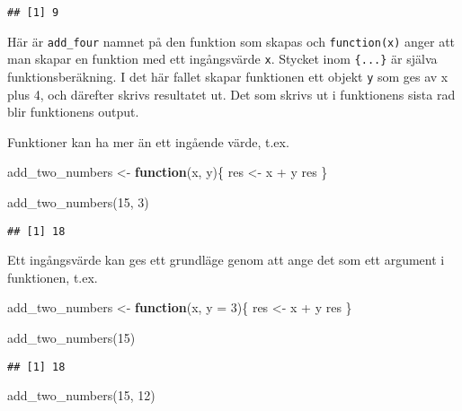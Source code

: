 \documentclass[
]{book}
\newenvironment{Shaded}{\begin{snugshade}}{\end{snugshade}}
\newcommand{\AttributeTok}[1]{\textcolor[rgb]{0.77,0.63,0.00}{#1}}
\newcommand{\ControlFlowTok}[1]{\textcolor[rgb]{0.13,0.29,0.53}{\textbf{#1}}}
\newcommand{\DecValTok}[1]{\textcolor[rgb]{0.00,0.00,0.81}{#1}}
\newcommand{\FunctionTok}[1]{\textcolor[rgb]{0.00,0.00,0.00}{#1}}
\newcommand{\NormalTok}[1]{#1}
\newcommand{\OtherTok}[1]{\textcolor[rgb]{0.56,0.35,0.01}{#1}}
\newcommand{\SpecialCharTok}[1]{\textcolor[rgb]{0.00,0.00,0.00}{#1}}
\theoremstyle{definition}
\theoremstyle{definition}
\theoremstyle{definition}
\theoremstyle{definition}
\theoremstyle{remark}
\begin{document}
\begin{verbatim}
## [1] 9
\end{verbatim}

Här är \texttt{add\_four} namnet på den funktion som skapas och \texttt{function(x)} anger att man skapar en funktion med ett ingångsvärde \texttt{x}. Stycket inom \texttt{\{...\}} är själva funktionsberäkning. I det här fallet skapar funktionen ett objekt \texttt{y} som ges av x plus 4, och därefter skrivs resultatet ut. Det som skrivs ut i funktionens sista rad blir funktionens output.

Funktioner kan ha mer än ett ingående värde, t.ex.

\begin{Shaded}
\begin{Highlighting}[]
\NormalTok{add\_two\_numbers }\OtherTok{\textless{}{-}} \ControlFlowTok{function}\NormalTok{(x, y)\{}
\NormalTok{  res }\OtherTok{\textless{}{-}}\NormalTok{ x }\SpecialCharTok{+}\NormalTok{ y}
\NormalTok{  res}
\NormalTok{\}}

\FunctionTok{add\_two\_numbers}\NormalTok{(}\DecValTok{15}\NormalTok{, }\DecValTok{3}\NormalTok{)}
\end{Highlighting}
\end{Shaded}

\begin{verbatim}
## [1] 18
\end{verbatim}

Ett ingångsvärde kan ges ett grundläge genom att ange det som ett argument i funktionen, t.ex.

\begin{Shaded}
\begin{Highlighting}[]
\NormalTok{add\_two\_numbers }\OtherTok{\textless{}{-}} \ControlFlowTok{function}\NormalTok{(x, }\AttributeTok{y =} \DecValTok{3}\NormalTok{)\{}
\NormalTok{  res }\OtherTok{\textless{}{-}}\NormalTok{ x }\SpecialCharTok{+}\NormalTok{ y}
\NormalTok{  res}
\NormalTok{\}}

\FunctionTok{add\_two\_numbers}\NormalTok{(}\DecValTok{15}\NormalTok{)}
\end{Highlighting}
\end{Shaded}

\begin{verbatim}
## [1] 18
\end{verbatim}

\begin{Shaded}
\begin{Highlighting}[]
\FunctionTok{add\_two\_numbers}\NormalTok{(}\DecValTok{15}\NormalTok{, }\DecValTok{12}\NormalTok{)}
\end{Highlighting}
\end{Shaded}
\end{document}
